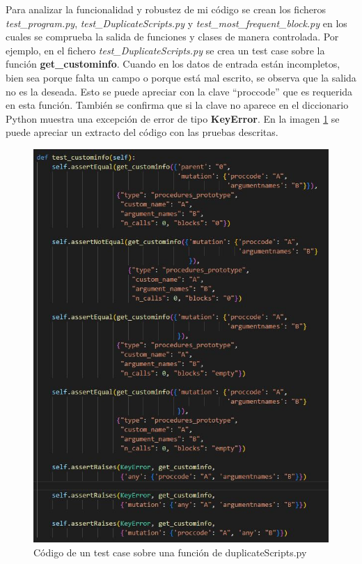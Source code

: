 \documentclass[a4paper, 12pt]{book}
\begin{document}
Para analizar la funcionalidad y robustez de mi código se crean los ficheros \textit{test\_program.py}, \textit{test\_DuplicateScripts.py} y \textit{test\_most\_frequent\_block.py} en los cuales se comprueba la salida de funciones y clases de manera controlada. Por ejemplo, en el fichero \textit{test\_DuplicateScripts.py} se crea un test case sobre la función \textbf{get\_custominfo}. Cuando en los datos de entrada están incompletos, bien sea porque falta un campo o porque está mal escrito, se observa que la salida no es la deseada. Esto se puede apreciar con la clave ``proccode'' que es requerida en esta función. También se confirma que si la clave no aparece en el diccionario Python muestra una excepción de error de tipo \textbf{KeyError}. En la imagen \ref{fig:code_testduplicate} se puede apreciar un extracto del código con las pruebas descritas.

\begin{figure}[!htb]
  \centering
  \includegraphics[width=13cm, keepaspectratio]{img/code_testduplicate.jpg}
  \caption{Código de un test case sobre una función de duplicateScripts.py}
  \label{fig:code_testduplicate}
\end{figure}
\end{document}
